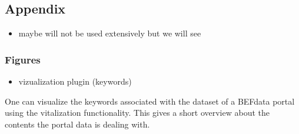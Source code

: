 \documentclass[]{article}
\begin{document}
\subsection{Appendix}

\begin{itemize}
\itemsep1pt\parskip0pt
\item
  maybe will not be used extensively but we will see
\end{itemize}

\subsubsection{Figures}

\begin{itemize}
\itemsep1pt\parskip0pt
\item
  vizualization plugin (keywords)
\end{itemize}

One can visualize the keywords associated with the dataset of a BEFdata
portal using the vitalization functionality. This gives a short overview
about the contents the portal data is dealing with.
\end{document}
